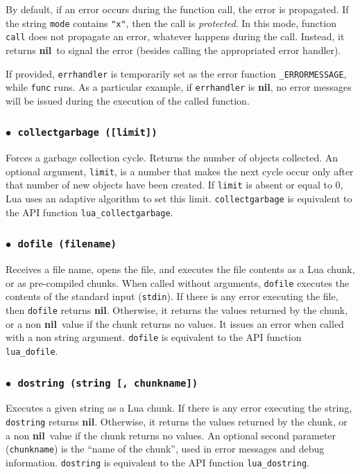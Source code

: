 \documentclass[11pt]{article}
\newcommand{\T}[1]{{\tt #1}}
\newcommand{\nil}{{\bf nil}}
\newcommand{\Deffunc}[1]{\index{#1}}
\newcommand{\ff}{$\bullet$\ }
\begin{document}
By default,
if an error occurs during the function call,
the error is propagated.
If the string \verb|mode| contains \verb|"x"|,
then the call is \emph{protected}.
In this mode, function \verb|call| does not propagate an error,
whatever happens during the call.
Instead, it returns \nil\ to signal the error
(besides calling the appropriated error handler).

If provided,
\verb|errhandler| is temporarily set as the error function
\verb|_ERRORMESSAGE|, while \verb|func| runs.
As a particular example, if \verb|errhandler| is \nil,
no error messages will be issued during the execution of the called function.

\subsubsection*{\ff \T{collectgarbage ([limit])}}\Deffunc{collectgarbage}
Forces a garbage collection cycle.
Returns the number of objects collected.
An optional argument, \verb|limit|, is a number that
makes the next cycle occur only after that number of new
objects have been created.
If \verb|limit| is absent or equal to 0,
Lua uses an adaptive algorithm to set this limit.
\verb|collectgarbage| is equivalent to
the API function \verb|lua_collectgarbage|.

\subsubsection*{\ff \T{dofile (filename)}}\Deffunc{dofile}
Receives a file name,
opens the file, and executes the file contents as a Lua chunk,
or as pre-compiled chunks.
When called without arguments,
\verb|dofile| executes the contents of the standard input (\verb|stdin|).
If there is any error executing the file,
then \verb|dofile| returns \nil.
Otherwise, it returns the values returned by the chunk,
or a non \nil\ value if the chunk returns no values.
It issues an error when called with a non string argument.
\verb|dofile| is equivalent to the API function \verb|lua_dofile|.

\subsubsection*{\ff \T{dostring (string [, chunkname])}}\Deffunc{dostring}
Executes a given string as a Lua chunk.
If there is any error executing the string,
\verb|dostring| returns \nil.
Otherwise, it returns the values returned by the chunk,
or a non \nil\ value if the chunk returns no values.
An optional second parameter (\verb|chunkname|)
is the ``name of the chunk'',
used in error messages and debug information.
\verb|dostring| is equivalent to the API function \verb|lua_dostring|.
\end{document}
